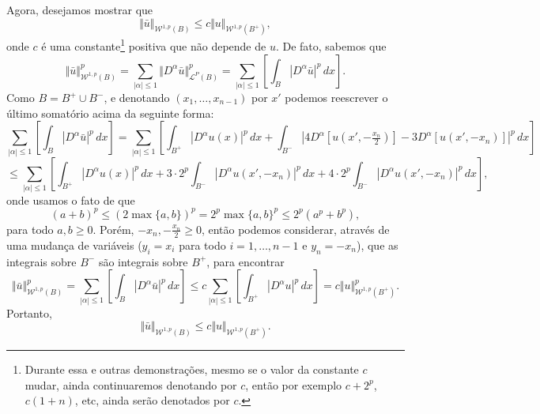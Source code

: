 \documentclass[a4paper, 11pt]{book}
\theoremstyle{definition}
\newcommand{\cL}{\mathcal{L}}
\newcommand{\cW}{\mathcal{W}}
\begin{document}
\begin{prf}
    Agora, desejamos mostrar que 
    \begin{equation} \label{eq:desigualdade-B-Bmais}
        \Vert \bar u \Vert_{\cW^{1,p}(B)} \leqslant c \Vert u \Vert_{\cW^{1,p}(B^+)},
    \end{equation}
    onde $c$ é uma constante\footnote{Durante essa e outras demonstrações, mesmo se o valor da constante $c$ mudar, ainda continuaremos denotando por $c$, então por exemplo $c + 2^p$, $c(1 + n)$, etc, ainda serão denotados por $c$.} positiva que não depende de $u$.
    De fato, sabemos que
    \[
        \Vert \bar u \Vert_{\cW^{1,p}(B)}^p = \sum_{|\alpha| \leqslant 1} \Vert D^\alpha\bar u \Vert_{\cL^P(B)}^p = \sum_{|\alpha| \leqslant 1} \left[\int_B |D^\alpha \bar u| ^p \,dx\right].
    \]
    Como $B = B^+ \cup B^-$, e denotando $(x_1,\dots,x_{n-1})$ por $x'$ podemos reescrever o último somatório acima da seguinte forma:
    \[
        \sum_{|\alpha| \leqslant 1} \left[\int_B |D^\alpha \bar u| ^p \,dx\right] = \sum_{|\alpha| \leqslant 1} \left[ \int_{B^+} |D^\alpha u(x)|^p \,dx + \int_{B^-} |4D^\alpha [u(x',-\tfrac{x_n}{2})] - 3D^\alpha [u(x',-x_n)] |^p \,dx \right]
    \]
    \[
        \leqslant \sum_{|\alpha| \leqslant 1} \left[ \int_{B^+} |D^\alpha u(x)|^p \,dx + 3 \cdot 2^p\int_{B^-} |D^\alpha u(x',-x_n)|^p \,dx + 4 \cdot 2^p\int_{B^-} |D^\alpha u(x',-x_n)|^p \,dx   \right], 
    \]
    onde usamos o fato de que
    \[
        (a + b)^p \leqslant (2 \max\{a,b\})^p = 2^p \max\{a,b\}^p \leqslant 2^p (a^p + b^p),
    \]
    para todo $a,b \geqslant 0$. Porém, $-x_n, -\tfrac{x_n}{2} \geqslant 0$, então podemos considerar, através de uma mudança de variáveis ($y_i = x_i$ para todo $i = 1,\dots,n-1$ e $y_n = -x_n$), que as integrais sobre $B^-$ são integrais sobre $B^+$, para encontrar
    \[
        \Vert \bar u \Vert_{\cW^{1,p}(B)}^p = \sum_{|\alpha| \leqslant 1} \left[\int_B |D^\alpha \bar u| ^p \,dx\right] \leqslant c\sum_{|\alpha| \leqslant 1} \left[ \int_{B^+}|D^\alpha u|^p \,dx \right] = c \Vert u \Vert_{\cW^{1,p}(B^+)}^p.
    \]
    Portanto,
    \[
        \Vert \bar u \Vert_{\cW^{1,p}(B)} \leqslant c \Vert u \Vert_{\cW^{1,p}(B^+)}.
    \]


\end{prf}
\end{document}
